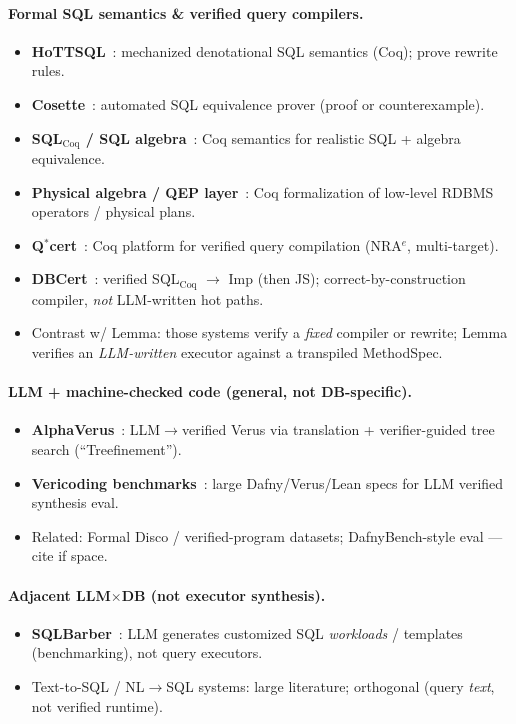 \documentclass[sigconf, nonacm]{acmart}
\begin{document}
\paragraph{Formal SQL semantics \& verified query compilers.}
\begin{itemize}
  \item \textbf{HoTTSQL}~\cite{Chu2017HoTTSQL}: mechanized denotational SQL semantics (Coq); prove rewrite rules.
  \item \textbf{Cosette}~\cite{Chu2017Cosette}: automated SQL equivalence prover (proof or counterexample).
  \item \textbf{SQL$_{\mathrm{Coq}}$ / SQL algebra}~\cite{Benzaken2019SQLCoq}: Coq semantics for realistic SQL + algebra equivalence.
  \item \textbf{Physical algebra / QEP layer}~\cite{Benzaken2018Physical}: Coq formalization of low-level RDBMS operators / physical plans.
  \item \textbf{Q$^\ast$cert}~\cite{Auerbach2017Qcert}: Coq platform for verified query compilation (NRA$^e$, multi-target).
  \item \textbf{DBCert}~\cite{Benzaken2022DBCert}: verified SQL$_{\mathrm{Coq}}$ $\to$ Imp (then JS); correct-by-construction compiler, \emph{not} LLM-written hot paths.
  \item Contrast w/ Lemma: those systems verify a \emph{fixed} compiler or rewrite; Lemma verifies an \emph{LLM-written} executor against a transpiled MethodSpec.
\end{itemize}

\paragraph{LLM + machine-checked code (general, not DB-specific).}
\begin{itemize}
  \item \textbf{AlphaVerus}~\cite{Aggarwal2025AlphaVerus}: LLM$\to$verified Verus via translation + verifier-guided tree search (``Treefinement'').
  \item \textbf{Vericoding benchmarks}~\cite{Dougherty2025Vericoding}: large Dafny/Verus/Lean specs for LLM verified synthesis eval.
  \item Related: Formal Disco / verified-program datasets; DafnyBench-style eval --- cite if space.
\end{itemize}

\paragraph{Adjacent LLM$\times$DB (not executor synthesis).}
\begin{itemize}
  \item \textbf{SQLBarber}~\cite{Lao2025SQLBarber}: LLM generates customized SQL \emph{workloads} / templates (benchmarking), not query executors.
  \item Text-to-SQL / NL$\to$SQL systems: large literature; orthogonal (query \emph{text}, not verified runtime).
\end{itemize}
\end{document}

